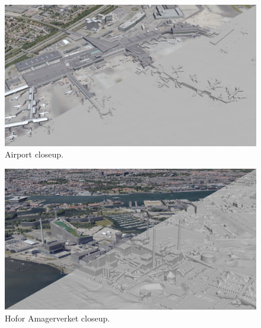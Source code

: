 \documentclass[10pt,letterpaper]{article}
\begin{document}
\begin{figure}
    \centering
    \capstart
    \begin{minipage}[b]{1.0\linewidth}
        \includegraphics[width=\textwidth]{images/copenhagen/results/closeups/diag/airport_diag.jpg}
    \end{minipage}
    \caption{Airport closeup.}
    \label{fig:closeup_airport}
\end{figure}

\begin{figure}
    \centering
    \capstart
    \begin{minipage}[b]{1.0\linewidth}
        \includegraphics[width=\textwidth]{images/copenhagen/results/closeups/diag/hofor_as_diag.jpg}
    \end{minipage}
    \caption{Hofor Amagerverket closeup.}
    \label{fig:closeup_hofor}
\end{figure}
\end{document}
